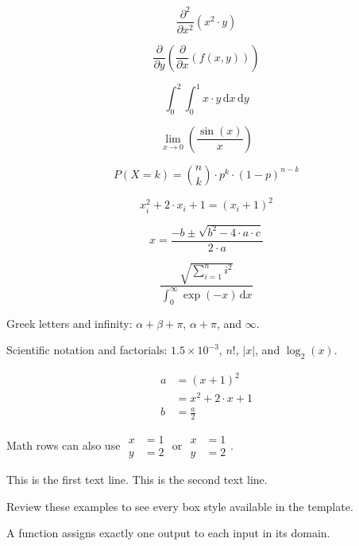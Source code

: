 \documentclass[11pt]{article}
\begin{document}
\[
\frac{\partial^{2}}{\partial{x}^{2}}\left(x^{2} \cdot y\right)
\]

\[
\frac{\partial}{\partial y}\left(\frac{\partial}{\partial x}\left(f\left(x, y\right)\right)\right)
\]

\[
\int_{0}^{2} {\int_{0}^{1} {x \cdot y}\,\mathrm{d}x}\,\mathrm{d}y
\]

\[
\lim_{x\to 0} \left(\frac{\sin\left(x\right)}{x}\right)
\]

\[
P\left(X = k\right) = \binom{n}{k} \cdot p^{k} \cdot \left(1 - p\right)^{n - k}
\]

\[
x_{i}^{2} + 2 \cdot x_{i} + 1 = \left(x_{i} + 1\right)^{2}
\]

\[
x = \frac{-b \pm \sqrt{b^{2} - 4 \cdot a \cdot c}}{2 \cdot a}
\]

\[
\frac{\sqrt{\sum_{i=1}^{n} {i^{2}}}}{\int_{0}^{\infty} {\exp\left(-x\right)}\,\mathrm{d}x}
\]

Greek letters and infinity: \(\alpha + \beta + \pi\), \(\alpha + \pi\), and \(\infty\).

Scientific notation and factorials: \(1.5 \times 10^{-3}\), \(n!\), \(\left|x\right|\), and \(\log_{2}\left(x\right)\).

\[
\begin{aligned}
a &= \left(x + 1\right)^{2} \\
&= x^{2} + 2 \cdot x + 1 \\
b &= \frac{a}{2}
\end{aligned}
\]

Math rows can also use \(\begin{aligned}
x &= 1 \\
y &= 2
\end{aligned}\) or \(\begin{aligned}
x &= 1 \\
y &= 2
\end{aligned}\).

This is the first text line. \leavevmode\newline{} This is the second text line.

\par\medskip


Review these examples to see every box style available in the template.

\begin{definitionbox}
A function assigns exactly one output to each input in its domain.
\end{definitionbox}
\end{document}
